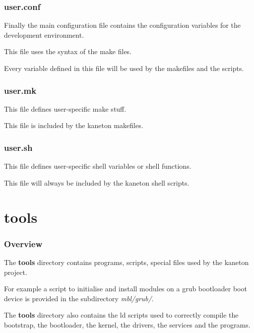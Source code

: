 
\begin{frame}
  \frametitle{user.conf}

  Finally the main configuration file contains the configuration
  variables for the development environment.

  \nl

  This file uses the syntax of the make files.

  \nl

  Every variable defined in this file will be used by the makefiles
  and the scripts.
\end{frame}


\begin{frame}
  \frametitle{user.mk}

  This file defines user-specific make stuff.

  \nl

  This file is included by the kaneton makefiles.
\end{frame}


\begin{frame}
  \frametitle{user.sh}

  This file defines user-specific shell variables or shell functions.

  \nl

  This file will always be included by the kaneton shell scripts.
\end{frame}

%
%

\section{tools}


\begin{frame}
  \frametitle{Overview}

  The \textbf{tools} directory contains programs, scripts, special
  files used by the kaneton project.

  \nl

  For example a script to initialise and install modules on a grub
  bootloader boot device is provided in the subdirectory
  \textit{mbl/grub/}.

  \nl

  The \textbf{tools} directory also contains the ld scripts used
  to correctly compile the bootstrap, the bootloader, the kernel, the
  drivers, the services and the programs.
\end{frame}

